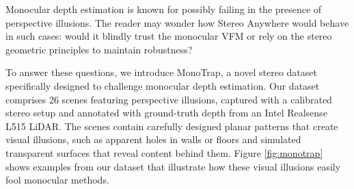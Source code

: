 \documentclass[10pt,twocolumn,letterpaper]{article}
\newcommand{\method}[0]{Stereo Anywhere\xspace}
\begin{document}
Monocular depth estimation is known for possibly failing in the presence of perspective illusions.
The reader may wonder how \method would behave in such cases: would it blindly trust the monocular VFM or rely on the stereo geometric principles to maintain robustness?

To answer these questions, we introduce MonoTrap, a novel stereo dataset specifically designed to challenge monocular depth estimation. Our dataset comprises 26 scenes featuring perspective illusions, captured with a calibrated stereo setup and annotated with ground-truth depth from an Intel Realsense L515 LiDAR.
The scenes contain carefully designed planar patterns that create visual illusions, such as apparent holes in walls or floors and simulated transparent surfaces that reveal content behind them.
Figure \ref{fig:monotrap} shows examples from our dataset that illustrate how these visual illusions easily fool monocular methods.
\end{document}
